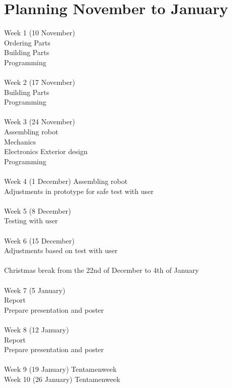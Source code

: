 \documentclass[11pt,twoside,a4paper]{report}
\begin{document}
\chapter{Planning November to January}
Week 1 (10 November)\\
Ordering Parts\\
Building Parts\\
Programming\\
\\
Week 2 (17 November)\\
Building Parts\\
Programming\\
\\
Week 3 (24 November)\\
Assembling robot\\
	Mechanics\\
	Electronics
	Exterior design\\
	Programming\\
\\
Week 4 (1 December)
Assembling robot\\
Adjustments in prototype for safe test with user\\
\\
Week 5 (8 December)\\
Testing with user\\
\\
Week 6 (15 December)\\
Adjustments based on test with user\\
\\
Christmas break from the 22nd of December to 4th of January\\
\\
Week 7 (5 January)\\
Report\\
Prepare presentation and poster\\
\\
Week 8 (12 January)\\
Report\\
Prepare presentation and poster\\
\\
Week 9 (19 January) Tentamenweek\\Week 10 (26 January) Tentamenweek
\end{document}
